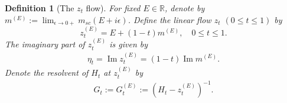 \documentclass[10pt,reqno]{article}
\DeclareMathOperator{\im}{{\mathrm{Im}}}
\theoremstyle{plain} %
\newtheorem{definition}[theorem]{Definition}
\theoremstyle{remark}
\numberwithin{equation}{section}
\begin{document}
\begin{definition}[The $z_t$ flow]\label{def_flow}
For fixed $E \in \mathbb R$,  %
denote by $
m^{(E)}:=\lim_{\epsilon\to 0+}m_{sc}(E+i \epsilon)$.
Define the linear flow  $z_t$  $(0\le t\le 1)$ by 
\begin{equation}\nonumber
  z^{(E)}_t=E+(1-t) m^{(E)}  ,\quad 0\le t\le 1.   
\end{equation}
The imaginary part of $ z^{(E)}_t$ is given by 
\begin{align}\label{eta}
\eta_t = \im  z^{(E)}_t =  (1-t)  \im m^{(E)}.
\end{align}
Denote the resolvent of $H_{t}$ at  $z^{(E)}_t$ by 
\begin{align}\label{GHzE}
G_{t}:=G_{t}^{(E)}:=(H_{t}-z^{(E)}_t)^{-1}.
\end{align}
\end{definition}
 
\end{document}
